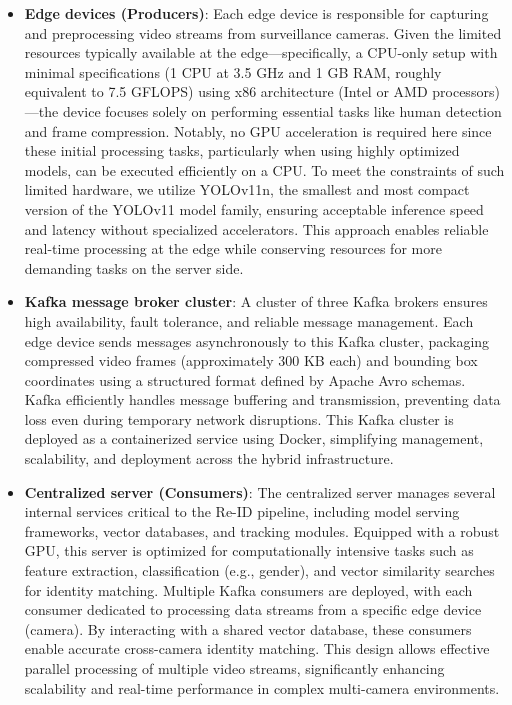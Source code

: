 \documentclass[../main.tex]{subfiles}
\begin{document}
\begin{itemize}
    \item \textbf{Edge devices (Producers)}: Each edge device is responsible for capturing and preprocessing video streams from surveillance cameras. Given the limited resources typically available at the edge—specifically, a CPU-only setup with minimal specifications (1 CPU at 3.5 GHz and 1 GB RAM, roughly equivalent to 7.5 GFLOPS) using x86 architecture (Intel or AMD processors)—the device focuses solely on performing essential tasks like human detection and frame compression. Notably, no GPU acceleration is required here since these initial processing tasks, particularly when using highly optimized models, can be executed efficiently on a CPU. To meet the constraints of such limited hardware, we utilize YOLOv11n, the smallest and most compact version of the YOLOv11 model family, ensuring acceptable inference speed and latency without specialized accelerators. This approach enables reliable real-time processing at the edge while conserving resources for more demanding tasks on the server side.

    
    \item \textbf{Kafka message broker cluster}: A cluster of three Kafka brokers ensures high availability, fault tolerance, and reliable message management. Each edge device sends messages asynchronously to this Kafka cluster, packaging compressed video frames (approximately 300 KB each) and bounding box coordinates using a structured format defined by Apache Avro schemas. Kafka efficiently handles message buffering and transmission, preventing data loss even during temporary network disruptions. This Kafka cluster is deployed as a containerized service using Docker, simplifying management, scalability, and deployment across the hybrid infrastructure.
    
    \item \textbf{Centralized server (Consumers)}: The centralized server manages several internal services critical to the Re-ID pipeline, including model serving frameworks, vector databases, and tracking modules. Equipped with a robust GPU, this server is optimized for computationally intensive tasks such as feature extraction, classification (e.g., gender), and vector similarity searches for identity matching. Multiple Kafka consumers are deployed, with each consumer dedicated to processing data streams from a specific edge device (camera). By interacting with a shared vector database, these consumers enable accurate cross-camera identity matching. This design allows effective parallel processing of multiple video streams, significantly enhancing scalability and real-time performance in complex multi-camera environments.
\end{itemize}
\end{document}
